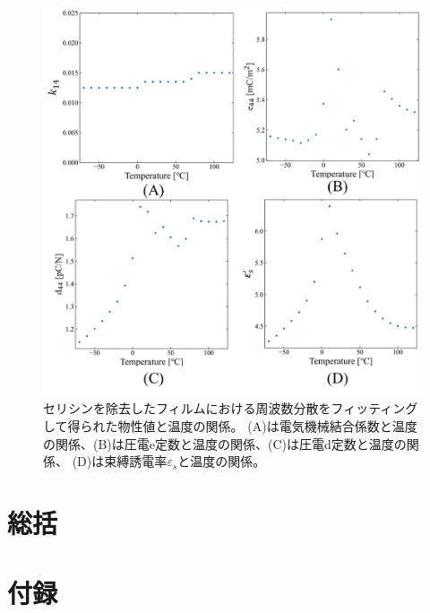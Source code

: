 \documentclass[dvipdfmx,12pt,a4paper]{jreport}
\begin{document}
			\begin{figure}[h]
				\centering
				\includegraphics[scale=0.8]{温度_k_e_d_セリシンなし.jpg}
				\caption{セリシンを除去したフィルムにおける周波数分散をフィッティングして得られた物性値と温度の関係。
				(A)は電気機械結合係数と温度の関係、(B)は圧電e定数と温度の関係、(C)は圧電d定数と温度の関係、
				(D)は束縛誘電率$\varepsilon_s$と温度の関係。}
				\label{温度_k_e_d_セリシンなし}
			\end{figure}
		

	\chapter{総括}
	\chapter{付録}
\end{document}
